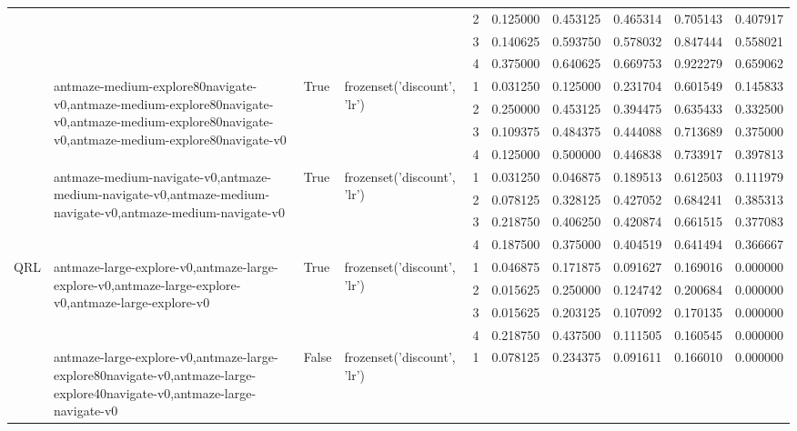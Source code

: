 \begin{tabular}{lllllrrrrr}
 &  &  &  & 2 & 0.125000 & 0.453125 & 0.465314 & 0.705143 & 0.407917 \\
 &  &  &  & 3 & 0.140625 & 0.593750 & 0.578032 & 0.847444 & 0.558021 \\
 &  &  &  & 4 & 0.375000 & 0.640625 & 0.669753 & 0.922279 & 0.659062 \\
\cline{2-10} \cline{3-10} \cline{4-10}
 & \multirow[t]{4}{*}{antmaze-medium-explore80navigate-v0,antmaze-medium-explore80navigate-v0,antmaze-medium-explore80navigate-v0,antmaze-medium-explore80navigate-v0} & \multirow[t]{4}{*}{True} & \multirow[t]{4}{*}{frozenset({'discount', 'lr'})} & 1 & 0.031250 & 0.125000 & 0.231704 & 0.601549 & 0.145833 \\
 &  &  &  & 2 & 0.250000 & 0.453125 & 0.394475 & 0.635433 & 0.332500 \\
 &  &  &  & 3 & 0.109375 & 0.484375 & 0.444088 & 0.713689 & 0.375000 \\
 &  &  &  & 4 & 0.125000 & 0.500000 & 0.446838 & 0.733917 & 0.397813 \\
\cline{2-10} \cline{3-10} \cline{4-10}
 & \multirow[t]{4}{*}{antmaze-medium-navigate-v0,antmaze-medium-navigate-v0,antmaze-medium-navigate-v0,antmaze-medium-navigate-v0} & \multirow[t]{4}{*}{True} & \multirow[t]{4}{*}{frozenset({'discount', 'lr'})} & 1 & 0.031250 & 0.046875 & 0.189513 & 0.612503 & 0.111979 \\
 &  &  &  & 2 & 0.078125 & 0.328125 & 0.427052 & 0.684241 & 0.385313 \\
 &  &  &  & 3 & 0.218750 & 0.406250 & 0.420874 & 0.661515 & 0.377083 \\
 &  &  &  & 4 & 0.187500 & 0.375000 & 0.404519 & 0.641494 & 0.366667 \\
\cline{1-10} \cline{2-10} \cline{3-10} \cline{4-10}
\multirow[t]{40}{*}{QRL} & \multirow[t]{4}{*}{antmaze-large-explore-v0,antmaze-large-explore-v0,antmaze-large-explore-v0,antmaze-large-explore-v0} & \multirow[t]{4}{*}{True} & \multirow[t]{4}{*}{frozenset({'discount', 'lr'})} & 1 & 0.046875 & 0.171875 & 0.091627 & 0.169016 & 0.000000 \\
 &  &  &  & 2 & 0.015625 & 0.250000 & 0.124742 & 0.200684 & 0.000000 \\
 &  &  &  & 3 & 0.015625 & 0.203125 & 0.107092 & 0.170135 & 0.000000 \\
 &  &  &  & 4 & 0.218750 & 0.437500 & 0.111505 & 0.160545 & 0.000000 \\
\cline{2-10} \cline{3-10} \cline{4-10}
 & \multirow[t]{4}{*}{antmaze-large-explore-v0,antmaze-large-explore80navigate-v0,antmaze-large-explore40navigate-v0,antmaze-large-navigate-v0} & \multirow[t]{4}{*}{False} & \multirow[t]{4}{*}{frozenset({'discount', 'lr'})} & 1 & 0.078125 & 0.234375 & 0.091611 & 0.166010 & 0.000000 \\

\end{tabular}
